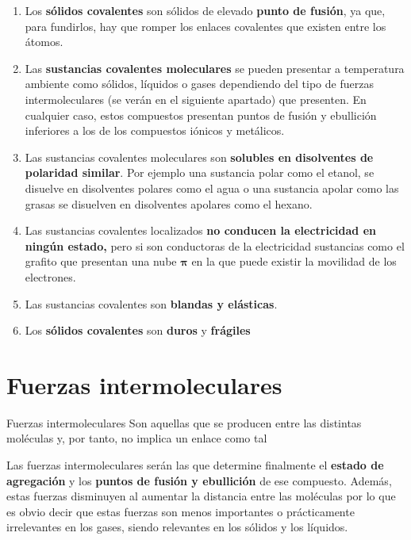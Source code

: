 \begin{enumerate}[label=\numberballmDarkTeal]
        \item Los \textbf{sólidos covalentes} son sólidos de elevado \textbf{punto de fusión}, ya que, para fundirlos, hay que romper los enlaces covalentes que existen entre los átomos.
        \item Las \textbf{sustancias covalentes moleculares}  se pueden presentar a temperatura ambiente como sólidos, líquidos o gases dependiendo del tipo de fuerzas intermoleculares (se verán en el siguiente apartado) que presenten.
        En cualquier caso, estos compuestos presentan puntos de fusión y ebullición inferiores a los de los compuestos iónicos y metálicos.
        \item Las sustancias covalentes moleculares son \textbf{solubles en disolventes de polaridad similar}.
        Por ejemplo una sustancia polar como el etanol, se disuelve en disolventes polares como el agua o una sustancia apolar como las grasas se disuelven en disolventes apolares como el hexano.
        \item Las sustancias covalentes localizados  \textbf{no conducen la electricidad en ningún estado,} pero si son conductoras de la electricidad sustancias como el grafito que presentan una nube \(\bm{\pi}\) en la que puede existir la movilidad de los electrones.
        \item Las sustancias covalentes son \textbf{blandas y elásticas}.
        \item Los \textbf{sólidos covalentes} son \textbf{duros} y \textbf{frágiles}
\end{enumerate}


\section{Fuerzas intermoleculares}\label{sec:fuerzas-intermoleculares}

\begin{center}
    \begin{definicion}[width=0.9\textwidth]{Fuerzas intermoleculares}
        Son aquellas que se producen entre las distintas moléculas y, por tanto, no implica un enlace como tal
    \end{definicion}
\end{center}


Las fuerzas intermoleculares serán las que determine finalmente el \textbf{estado de agregación} y los \textbf{puntos de fusión y ebullición} de ese compuesto.
Además, estas fuerzas disminuyen al aumentar la distancia entre las moléculas por lo que es obvio decir que estas fuerzas son menos importantes o prácticamente irrelevantes en los gases, siendo relevantes en los sólidos y los líquidos.


